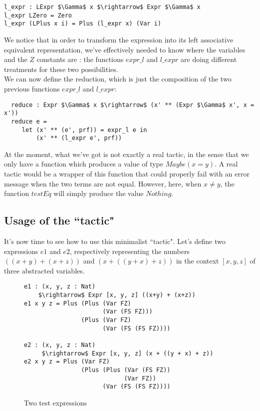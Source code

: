 \begin{lstlisting}
l_expr : LExpr $\Gamma$ x $\rightarrow$ Expr $\Gamma$ x
l_expr LZero = Zero
l_expr (LPlus x i) = Plus (l_expr x) (Var i)
\end{lstlisting}



We notice that in order to transform the expression into its left associative equivalent representation, we've effectively needed to know where the variables and the $Z$ constants are : the functions $expr\_l$ and $l\_expr$ are doing different treatments for these two possibilities. \\

We can now define the reduction, which is just the composition of the two previous functions $expr\_l$ and $l\_expr$:


\begin{lstlisting}
  reduce : Expr $\Gamma$ x $\rightarrow$ (x' ** (Expr $\Gamma$ x', x = x'))
  reduce e = 
     let (x' ** (e', prf)) = expr_l e in
         (x' ** (l_expr e', prf))
\end{lstlisting}



At the moment, what we've got is not exactly a real tactic, in the sense that we only have a function which produces a value of type $Maybe (x = y)$. A real tactic would be a wrapper of this function that could properly fail with an error message when the two terms are not equal. However, here, when $x\ne y$, the function $testEq$ will simply produce the value $Nothing$. \\

\subsection{Usage of the ``tactic"}

It's now time to see how to use this minimalist ``tactic".
Let's define two expressions $e1$ and $e2$, respectively representing the numbers $((x + y) + (x + z))$ and $(x + ((y + x) + z))$ in the context $[x, y, z]$ of three abstracted variables.


\begin{figure}[H]
\figrule
\begin{center}
\begin{lstlisting}
e1 : (x, y, z : Nat) 
    $\rightarrow$ Expr [x, y, z] ((x+y) + (x+z))
e1 x y z = Plus (Plus (Var FZ) 
                      (Var (FS FZ))) 
                (Plus (Var FZ) 
                      (Var (FS (FS FZ))))

e2 : (x, y, z : Nat) 
     $\rightarrow$ Expr [x, y, z] (x + ((y + x) + z))
e2 x y z = Plus (Var FZ) 
                (Plus (Plus (Var (FS FZ)) 
                            (Var FZ)) 
                      (Var (FS (FS FZ))))
\end{lstlisting}
\end{center}
\caption{Two test expressions}
\label{e1_e2}
\figrule
\end{figure}


